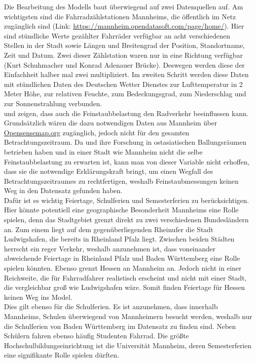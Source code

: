 \documentclass[a4paper,12pt]{thesis}
\begin{document}
Die Bearbeitung des Modells baut überwiegend auf zwei Datenquellen auf. Am wichtigsten sind die Fahrradzählstationen Mannheims, die öffentlich im Netz zugänglich sind (Link: \url{https://mannheim.opendatasoft.com/page/home/}). Hier sind stündliche Werte gezählter Fahrräder verfügbar an acht verschiedenen Stellen in der Stadt sowie Längen und Breitengrad der Position, Standortname, Zeit und Datum. Zwei dieser Zählstation waren nur in eine Richtung verfügbar (Kurt Schuhmacher und Konrad Adenauer Brücke). Deswegen werden diese der Einfachheit halber mal zwei multipliziert. Im zweiten Schritt werden diese Daten mit stündlichen Daten des Deutschen Wetter Dienstes zur Lufttemperatur in 2 Meter Höhe, zur relativen Feuchte, zum Bedeckungsgrad, zum Niederschlag und zur Sonnenstrahlung verbunden.\\
\cite{ZHAO2018826} und \cite{Hong2022} zeigen, dass auch die Feinstaubbelastung den Radverkehr beeinflussen kann. Grundsätzlich wären die dazu notwendigen Daten aus Mannheim über \url{Opensensemap.org} zugänglich, jedoch nicht für den gesamten Betrachtungszeitraum. Da \cite{ZHAO2018826} und \cite{Hong2022} ihre Forschung in ostasiatischen Ballungsräumen betrieben haben und in einer Stadt wie Mannheim nicht die selbe Feinstaubbelastung zu erwarten ist, kann man von dieser Variable nicht erhoffen, dass sie die notwendige Erklärungskraft bringt, um einen Wegfall des Betrachtungszeitraumes zu rechtfertigen, weshalb Feinstaubmessungen keinen Weg in den Datensatz gefunden haben.\\
Dafür ist es wichtig Feiertage, Schulferien und Semesterferien zu berücksichtigen. Hier könnte potentiell eine geographische Besonderheit Mannheims eine Rolle spielen, denn das Stadtgebiet grenzt direkt zu zwei verschiedenen Bundesländern an. Zum einem liegt auf dem gegenüberliegenden Rheinufer die Stadt Ludwigshafen, die bereits in Rheinland Pfalz liegt. Zwischen beiden Städten herrscht ein reger Verkehr, weshalb anzunehmen ist, dass voneinander abweichende Feiertage in Rheinland Pfalz und Baden Württemberg eine Rolle spielen könnten. Ebenso grenzt Hessen an Mannheim an. Jedoch nicht in einer Reichweite, die für Fahrradfahrer realistisch erscheint und nicht mit einer Stadt, die vergleichbar groß wie Ludwigshafen wäre. Somit finden Feiertage für Hessen keinen Weg ins Model.\\
Dies gilt ebenso für die Schulferien. Es ist anzunehmen, dass innerhalb Mannheims, Schulen überwiegend von Mannheimern besucht werden, weshalb nur die Schulferien von Baden Württemberg im Datensatz zu finden sind. Neben Schülern fahren ebenso häufig Studenten Fahrrad. Die größte Hochschulbildungseinrichtung ist die Universität Mannheim, deren Semesterferien eine signifikante Rolle spielen dürften.
\end{document}
